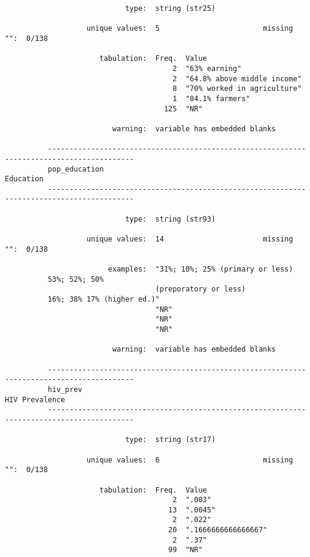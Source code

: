 \documentclass{article}
\begin{document}
\begin{verbatim}
                            type:  string (str25)
          
                   unique values:  5                        missing "":  0/138
          
                      tabulation:  Freq.  Value
                                       2  "63% earning"
                                       2  "64.8% above middle income"
                                       8  "70% worked in agriculture"
                                       1  "84.1% farmers"
                                     125  "NR"
          
                         warning:  variable has embedded blanks
          
          ------------------------------------------------------------------------------------------
          pop_education                                                                    Education
          ------------------------------------------------------------------------------------------
          
                            type:  string (str93)
          
                   unique values:  14                       missing "":  0/138
          
                        examples:  "31%; 10%; 25% (primary or less)
          53%; 52%; 50%
                                   (preporatory or less)
          16%; 38% 17% (higher ed.)"
                                   "NR"
                                   "NR"
                                   "NR"
          
                         warning:  variable has embedded blanks
          
          ------------------------------------------------------------------------------------------
          hiv_prev                                                                    HIV Prevalence
          ------------------------------------------------------------------------------------------
          
                            type:  string (str17)
          
                   unique values:  6                        missing "":  0/138
          
                      tabulation:  Freq.  Value
                                       2  ".003"
                                      13  ".0045"
                                       2  ".022"
                                      20  ".1666666666666667"
                                       2  ".37"
                                      99  "NR"
          

\end{verbatim}
\end{document}
